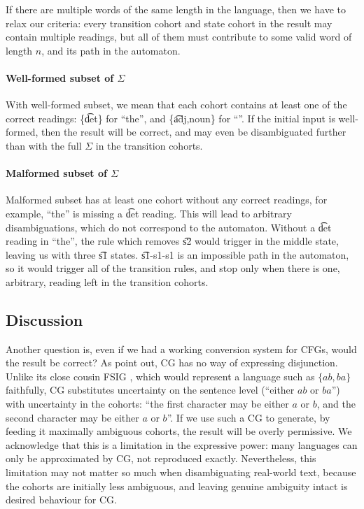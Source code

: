 If there are multiple words of the same length in the language, then
we have to relax our criteria: every transition cohort and state
cohort in the result may contain multiple readings, but all of them
must contribute to some valid word of length $n$, and its path in the
automaton. 

\paragraph{Well-formed subset of $\Sigma$}
With well-formed subset, we mean that each cohort contains
at least one of the correct readings: \{\t{det}\} for ``the'', and
\{\t{adj,noun}\} for ``\exampleWord{}''. 
If the initial input is well-formed, then the result will be correct,
and may even be disambiguated further than with the full $\Sigma$ in
the transition cohorts.

\paragraph{Malformed subset of $\Sigma$}
Malformed subset has at least one cohort without any correct readings,
for example, ``the'' is missing a \t{det} reading.
This will lead to arbitrary disambiguations, which do not correspond to the automaton.
Without a \t{det} reading in ``the'', the rule which removes \t{s2}
would trigger in the middle state, leaving us with three \t{s1}
states. \t{s1-s1-s1} is an impossible path in the automaton,
so it would trigger all of the transition rules, and stop only when
there is one, arbitrary, reading left in the transition cohorts.




\subsection{Discussion}

Another question is, even if we had a working conversion system for
CFGs, would the result be correct?
As  point out, CG has no way of expressing disjunction.
Unlike its close cousin FSIG \cite{koskenniemi90}, which would represent a 
language such as $\{ab,ba\}$ faithfully, CG substitutes uncertainty on the 
sentence level (``either $ab$ or $ba$'') with uncertainty in the cohorts: 
``the first character may be either $a$ or $b$, and the second character 
may be either $a$ or $b$''.
If we use such a CG to generate, by feeding it
maximally ambiguous cohorts, the result will be overly permissive.
We acknowledge that this is a limitation in the expressive power: many
languages can only be approximated by CG, not reproduced exactly.
Nevertheless, this limitation may not matter so much when
disambiguating real-world text, because the cohorts are initially less
ambiguous, and leaving genuine ambiguity intact is desired behaviour
for CG. 


